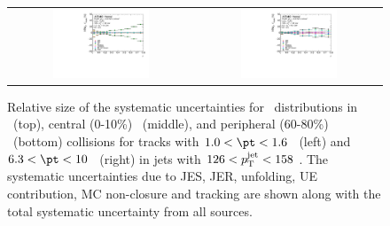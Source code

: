 \begin{figure}
{\begin{tabular}{cc}
\includegraphics[width=0.55\textwidth]{figures/systematics/ChPS_dR_sys_PbPb_error_trk2_jet7_cent5} &
\includegraphics[width=0.55\textwidth]{figures/systematics/ChPS_dR_sys_PbPb_error_trk6_jet7_cent5} \\
\end{tabular}}
\caption{
Relative size of the systematic uncertainties for \Dptr\ distributions in \pp\ (top), central (0-10\%) \pbpb\ (middle), and peripheral (60-80\%) \pbpb\ (bottom) collisions for tracks with $1.0 < \pt < 1.6$ \GeV\ (left) and $6.3 < \pt < 10$ \GeV\ (right) in jets with $126 < \mbox{$p_{\mathrm{T}}^{\mathrm{jet}}$} < 158$ \GeV. The systematic uncertainties due to JES, JER, unfolding, UE contribution, MC non-closure and tracking are shown along with the total systematic uncertainty from all sources.
}
\label{fig:Systematics_Dpt}
\end{figure}


